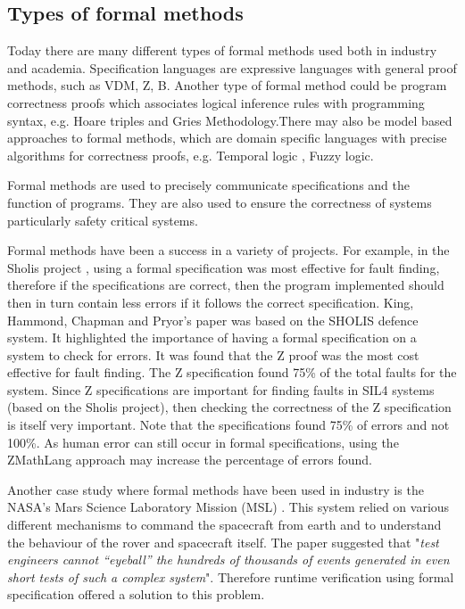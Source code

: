 \subsection{Types of formal methods}


Today there are many different types of formal methods used both in industry and academia. Specification languages are expressive languages with general proof methods, such as VDM, Z, B. Another type of formal method could be program correctness proofs which associates logical inference rules with programming syntax, e.g. Hoare triples and Gries Methodology.There may also be model based approaches to formal methods, which are domain specific languages with precise algorithms for correctness proofs, e.g. Temporal logic \cite{uwa}, Fuzzy logic.  

Formal methods are used to precisely communicate specifications and the function of programs. They are also used to ensure the correctness of systems particularly safety critical systems.

Formal methods have been a success in a variety of projects. For example, in the Sholis project \cite{sholis}, using a formal specification was most effective for fault finding, therefore if the specifications are correct, then the program implemented should then in turn contain less errors if it follows the correct specification.
King, Hammond, Chapman and Pryor's paper \cite{sholis} was based on the SHOLIS defence system. It highlighted the importance of having a formal specification on a system to check for errors. It was found that the Z proof was the most cost effective for fault finding. The Z specification found 75\% of the total faults for the system. Since Z specifications are important for finding faults in SIL4 systems (based on the Sholis project), then checking the correctness of the Z specification is itself very important. Note that the specifications found 75\% of errors and not 100\%. As human error can still occur in formal specifications, using the ZMathLang approach may increase the percentage of errors found.

Another case study where formal methods have been used in industry is the NASA’s Mars Science Laboratory Mission (MSL) \cite{DBLP:journals/corr/abs-1003-1682}. This system relied on various different mechanisms to command the spacecraft from earth and to understand the behaviour of the rover and spacecraft itself. The paper suggested that "\textit{test engineers cannot “eyeball”
the hundreds of thousands of events generated in even short tests of such a complex system}". Therefore runtime verification using formal specification offered a solution to this problem.

